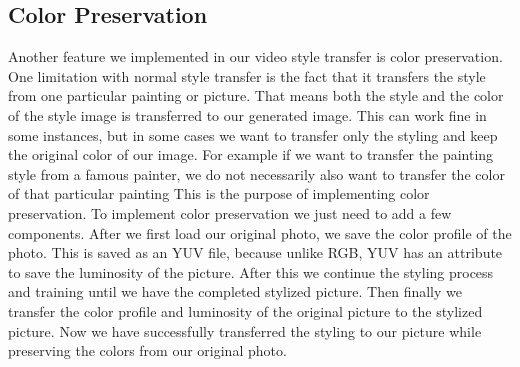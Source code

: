 \subsection{Color Preservation}
Another feature we implemented in our video style transfer is color preservation. One limitation with normal style transfer is the fact that it transfers the style from one particular painting or picture. That means both the style and the color of the style image is transferred to our generated image. This can work fine in some instances, but in some cases we want to transfer only the styling and keep the original color of our image. For example if we want to transfer the painting style from a famous painter, we do not necessarily also want to transfer the color of that particular painting This is the purpose of implementing color preservation.\newline\newline
To implement color preservation we just need to add a few components. After we first load our original photo, we save the color profile of the photo. This is saved as an YUV file, because unlike RGB, YUV has an attribute to save the luminosity of the picture. After this we continue the styling process and training until we have the completed stylized picture. Then finally we transfer the color profile and luminosity of the original picture to the stylized picture. Now we have successfully transferred the styling to our picture while preserving the colors from our original photo. 


